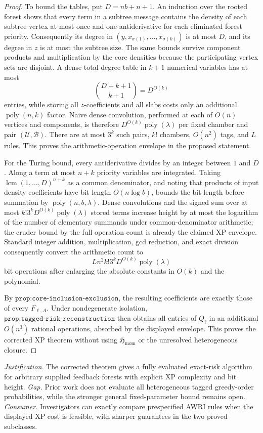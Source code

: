 \documentclass{article}
\begin{document}
\begin{proof}
To bound the tables, put \(D=nb+n+1\).  An induction over the rooted forest shows that every term in a subtree message contains the density of each subtree vertex at most once and one antiderivative for each eliminated forest priority.  Consequently its degree in \((y,x_{\sigma(1)},\ldots,x_{\sigma(k)})\) is at most \(D\), and its degree in \(z\) is at most the subtree size.  The same bounds survive component products and multiplication by the core densities because the participating vertex sets are disjoint.  A dense total-degree table in \(k+1\) numerical variables has at most
\[
 \binom{D+k+1}{k+1}=D^{O(k)}
\]
entries, while storing all \(z\)-coefficients and all slabs costs only an additional \(\operatorname{poly}(n,k)\) factor.  Naive dense convolution, performed at each of \(O(n)\) vertices and components, is therefore \(D^{O(k)}\operatorname{poly}(\lambda)\) per fixed chamber and pair \((\mathcal U,\mathcal B)\).  There are at most \(3^k\) such pairs, \(k!\) chambers, \(O(n^2)\) tags, and \(L\) rules.  This proves the arithmetic-operation envelope in the proposed statement.

For the Turing bound, every antiderivative divides by an integer between \(1\) and \(D\).  Along a term at most \(n+k\) priority variables are integrated.  Taking \(\operatorname{lcm}(1,\ldots,D)^{n+k}\) as a common denominator, and noting that products of input density coefficients have bit length \(O(n\log b)\), bounds the bit length before summation by \(\operatorname{poly}(n,b,\lambda)\).  Dense convolutions and the signed sum over at most \(k!3^kD^{O(k)}\operatorname{poly}(\lambda)\) stored terms increase height by at most the logarithm of the number of elementary summands under common-denominator arithmetic; the cruder bound by the full operation count is already the claimed XP envelope.  Standard integer addition, multiplication, gcd reduction, and exact division consequently convert the arithmetic count to
\[
 Ln^2k!3^kD^{O(k)}\operatorname{poly}(\lambda)
\]
bit operations after enlarging the absolute constants in \(O(k)\) and the polynomial.

By \(\texttt{prop:core-inclusion-exclusion}\), the resulting coefficients are exactly those of every \(F_{\ell,A}\).  Under nondegenerate isolation, \(\texttt{prop:tagged-risk-reconstruction}\) then obtains all entries of \(Q_\ell\) in an additional \(O(n^3)\) rational operations, absorbed by the displayed envelope.  This proves the corrected XP theorem without using \(\mathfrak H_{\mathrm{mom}}\) or the unresolved heterogeneous closure.
\end{proof}
\par\smallskip\noindent \textit{Justification.} The corrected theorem gives a fully evaluated exact-risk algorithm for arbitrary supplied feedback forests with explicit XP complexity and bit height. \textit{Gap.} Prior work does not evaluate all heterogeneous tagged greedy-order probabilities, while the stronger general fixed-parameter bound remains open. \textit{Consumer.} Investigators can exactly compare prespecified AWRI rules when the displayed XP cost is feasible, with sharper guarantees in the two proved subclasses.
\end{document}
